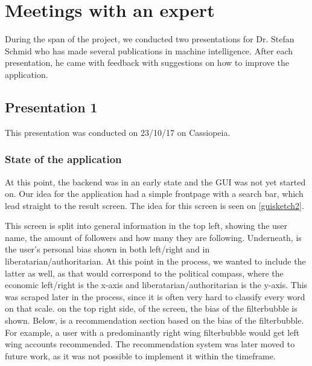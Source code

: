 \section{Meetings with an expert} \label{expMeeting}
During the span of the project, we conducted two presentations for Dr. Stefan
Schmid who has made several publications in machine intelligence. After
each presentation, he came with feedback with suggestions on how to improve the
application. 
\subsection{Presentation 1}
This presentation was conducted on 23/10/17 on Cassiopeia.
\subsubsection{State of the application}
At this point, the backend was in an early state and the \ac{GUI} was not yet
started on. Our idea for the application had a simple frontpage with a search
bar, which lead straight to the result screen. The idea for this screen is seen
on \autoref{guisketch2}.


This screen is split into general information in the top left, showing the user
name, the amount of followers and how many they are following. Underneath, is
the user's personal bias shown in both left/right and in
liberatarian/authoritarian. At this point in the process, we wanted to include
the latter as well, as that would correspond to the political compass, where the
economic left/right is the x-axis and liberatarian/authoritarian is the y-axis.
This was scraped later in the process, since it is often very hard to classify
every word on that scale. on the top right side, of the screen, the bias of the
filterbubble is shown. Below, is a recommendation section based on the bias of
the filterbubble. For example, a user with a predominantly right wing
filterbubble would get left wing accounts recommended. The recommendation system
was later moved to future work, as it was not possible to implement it within
the timeframe. 

